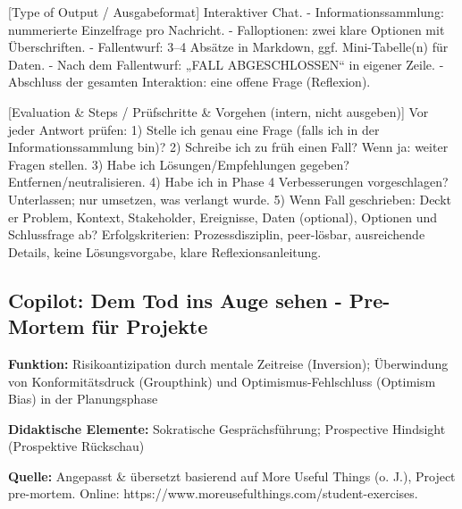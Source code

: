 \documentclass[
  ngerman,
  letterpaper,
  DIV=11]{scrreprt}
\newenvironment{Shaded}{\begin{snugshade}}{\end{snugshade}}
\newcommand{\CommentTok}[1]{\textcolor[rgb]{0.37,0.37,0.37}{#1}}
\newcommand{\NormalTok}[1]{\textcolor[rgb]{0.00,0.23,0.31}{#1}}
\newcommand{\OtherTok}[1]{\textcolor[rgb]{0.00,0.23,0.31}{#1}}
\newcommand{\SpecialStringTok}[1]{\textcolor[rgb]{0.13,0.47,0.30}{#1}}
\begin{document}
\begin{tcolorbox}
\begin{Shaded}
\begin{Highlighting}[]
\CommentTok{[}\OtherTok{Type of Output / Ausgabeformat}\CommentTok{]}
\NormalTok{Interaktiver Chat.}
\SpecialStringTok{{-} }\NormalTok{Informationssammlung: nummerierte Einzelfrage pro Nachricht.}
\SpecialStringTok{{-} }\NormalTok{Falloptionen: zwei klare Optionen mit Überschriften.}
\SpecialStringTok{{-} }\NormalTok{Fallentwurf: 3–4 Absätze in Markdown, ggf. Mini{-}Tabelle(n) für Daten.}
\SpecialStringTok{{-} }\NormalTok{Nach dem Fallentwurf: „FALL ABGESCHLOSSEN“ in eigener Zeile.}
\SpecialStringTok{{-} }\NormalTok{Abschluss der gesamten Interaktion: eine offene Frage (Reflexion).}

\CommentTok{[}\OtherTok{Evaluation \& Steps / Prüfschritte \& Vorgehen (intern, nicht ausgeben)}\CommentTok{]}
\NormalTok{Vor jeder Antwort prüfen:}
\NormalTok{1) Stelle ich genau eine Frage (falls ich in der Informationssammlung bin)?}
\NormalTok{2) Schreibe ich zu früh einen Fall? Wenn ja: weiter Fragen stellen.}
\NormalTok{3) Habe ich Lösungen/Empfehlungen gegeben? Entfernen/neutralisieren.}
\NormalTok{4) Habe ich in Phase 4 Verbesserungen vorgeschlagen? Unterlassen; nur umsetzen, was verlangt wurde.}
\NormalTok{5) Wenn Fall geschrieben: Deckt er Problem, Kontext, Stakeholder, Ereignisse, Daten (optional), Optionen und Schlussfrage ab?}
\NormalTok{Erfolgskriterien: Prozessdisziplin, peer{-}lösbar, ausreichende Details, keine Lösungsvorgabe, klare Reflexionsanleitung.}

\end{Highlighting}
\end{Shaded}

\end{tcolorbox}

\subsection{Copilot: Dem Tod ins Auge sehen - Pre-Mortem für
Projekte}\label{sec-prompt-project-premortem}

\textbf{Funktion:} Risikoantizipation durch mentale Zeitreise
(Inversion); Überwindung von Konformitätsdruck (Groupthink) und
Optimismus-Fehlschluss (Optimism Bias) in der Planungsphase

\textbf{Didaktische Elemente:} Sokratische Gesprächsführung; Prospective
Hindsight (Prospektive Rückschau)

\textbf{Quelle:} Angepasst \& übersetzt basierend auf More Useful Things
(o. J.), Project pre-mortem. Online:
https://www.moreusefulthings.com/student-exercises.
\end{document}
